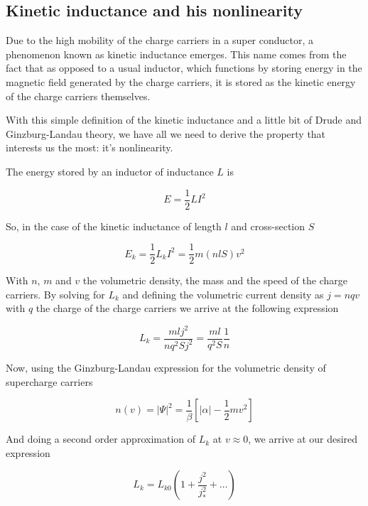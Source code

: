 \documentclass[../main.tex]{subfiles}
\begin{document}
\subsection{Kinetic inductance and his nonlinearity}
Due to the high mobility of the charge carriers in a super conductor, a phenomenon
known as kinetic inductance emerges. This name comes from the fact that as opposed
to a usual inductor, which functions by storing energy in the magnetic field
generated by the charge carriers, it is stored as the kinetic energy of the
charge carriers themselves.

With this simple definition of the kinetic inductance and a little bit of
Drude and Ginzburg-Landau theory, we have all we need to derive the property
that interests us the most: it's nonlinearity.

The energy stored by an inductor of inductance \(L\) is

\begin{equation}
\label{eq:InductiveEnergy}
    E = \frac{1}{2}LI^2
\end{equation}

So, in the case of the kinetic inductance of length \(l\) and cross-section \(S\)

\begin{equation}
\label{eq:KineticInductiveEnergy}
    E_{k} = \frac{1}{2}L_{k}I^2 = \frac{1}{2}m(nlS)v^2
\end{equation}

With \(n\), \(m\) and \(v\) the volumetric density, the mass and the speed of
the charge carriers. By solving for \(L_{k}\) and defining the volumetric
current density as \(j=nqv\) with \(q\) the charge of the charge carriers
we arrive at the following expression

\begin{equation}
\label{eq:LkOfn}
    L_{k} = \frac{mlj^2}{nq^2Sj^2} = \frac{ml}{q^2S}\frac{1}{n}
\end{equation}

Now, using the Ginzburg-Landau expression for the volumetric density of supercharge
carriers

\begin{equation}
\label{eq:GLn}
    n(v) = |\Psi|^2 = \frac{1}{\beta}\left[|\alpha| - \frac{1}{2}m v^2\right]
\end{equation}

And doing a second order approximation of \(L_{k}\) at \(v \approx 0\), we arrive
at our desired expression

\begin{equation}
\label{eq:KineticNonLineality}
    L_{k} = L_{k0}\left(1 + \frac{j^2}{j_{*}^2} + \dots\right)
\end{equation}
\end{document}
